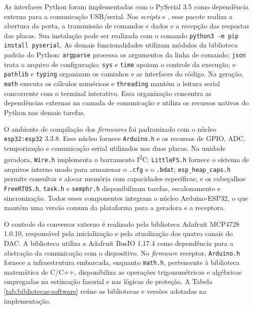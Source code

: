 As interfaces Python foram implementadas com o PySerial 3.5 como dependência externa para a comunicação USB/serial. Nos \textit{scripts}  e , esse pacote realiza a abertura da porta, a transmissão de comandos e dados e a recepção das respostas das placas. Sua instalação pode ser realizada com o comando \texttt{python3 -m pip install pyserial}. As demais funcionalidades utilizam módulos da biblioteca padrão do Python: \texttt{argparse} processa os argumentos da linha de comando; \texttt{json} trata o arquivo de configuração; \texttt{sys} e \texttt{time} apoiam o controle da execução; e \texttt{pathlib} e \texttt{typing} organizam os caminhos e as interfaces do código. Na geração, \texttt{math} executa os cálculos numéricos e \texttt{threading} mantém a leitura serial concorrente com o terminal interativo. Essa organização concentra as dependências externas na camada de comunicação e utiliza os recursos nativos do Python nas demais tarefas.

O ambiente de compilação dos \textit{firmwares} foi padronizado com o núcleo \texttt{esp32:esp32} 3.3.8. Esse núcleo fornece \texttt{Arduino.h} e os recursos de GPIO, ADC, temporização e comunicação serial utilizados nas duas placas. Na unidade geradora, \texttt{Wire.h} implementa o barramento I\textsuperscript{2}C; \texttt{LittleFS.h} fornece o sistema de arquivos interno usado para armazenar o \texttt{.cfg} e o \texttt{.bdat}; \texttt{esp\_heap\_caps.h} permite consultar e alocar memória com capacidades específicas; e os cabeçalhos \texttt{FreeRTOS.h}, \texttt{task.h} e \texttt{semphr.h} disponibilizam tarefas, escalonamento e sincronização. Todos esses componentes integram o núcleo Arduino-ESP32, o que mantém uma versão comum da plataforma para a geradora e a receptora.

O controle do conversor externo é realizado pela biblioteca Adafruit MCP4728 1.0.10, responsável pela inicialização e pela atualização dos quatro canais do DAC. A biblioteca utiliza a Adafruit BusIO 1.17.4 como dependência para a abstração da comunicação com o dispositivo. No \textit{firmware} receptor, \texttt{Arduino.h} fornece a infraestrutura embarcada, enquanto \texttt{math.h}, pertencente à biblioteca matemática de C/C++, disponibiliza as operações trigonométricas e algébricas empregadas na estimação fasorial e nas lógicas de proteção. A Tabela \ref{tab:bibliotecas-software} reúne as bibliotecas e versões adotadas na implementação.

